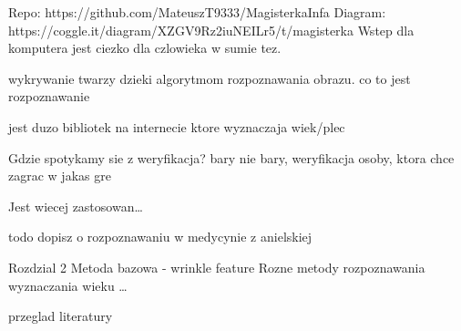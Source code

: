 Repo: https://github.com/MateuszT9333/MagisterkaInfa
Diagram: https://coggle.it/diagram/XZGV9Rz2iuNEILr5/t/magisterka
Wstep
dla komputera jest ciezko dla czlowieka w sumie tez.

wykrywanie twarzy dzieki algorytmom rozpoznawania obrazu. co to jest rozpoznawanie

jest duzo bibliotek na internecie ktore wyznaczaja wiek/plec

Gdzie spotykamy sie z weryfikacja? bary nie bary, weryfikacja osoby, ktora chce zagrac w jakas gre

Jest wiecej zastosowan…

todo dopisz o rozpoznawaniu w medycynie z anielskiej

Rozdzial 2 Metoda bazowa - wrinkle feature
Rozne metody rozpoznawania wyznaczania wieku …

przeglad literatury


